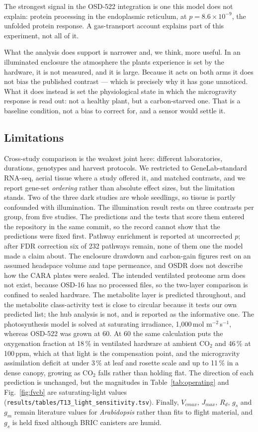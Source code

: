 \documentclass[pdflatex,sn-nature]{sn-jnl}
\begin{document}
The strongest signal in the OSD-522 integration is one this model does not explain: protein
processing in the endoplasmic reticulum, at $p = 8.6\times10^{-9}$, the unfolded protein
response. A gas-transport account explains part of this experiment, not all of it.

What the analysis does support is narrower and, we think, more useful. In an illuminated
enclosure the atmosphere the plants experience is set by the hardware, it is not measured, and
it is large. Because it acts on both arms it does not bias the published contrast --- which is
precisely why it has gone unnoticed. What it does instead is set the physiological state in
which the microgravity response is read out: not a healthy plant, but a carbon-starved one.
That is a baseline condition, not a bias to correct for, and a sensor would settle it.

\subsection{Limitations}

Cross-study comparison is the weakest joint here: different laboratories, durations,
genotypes and harvest protocols. We restricted to GeneLab-standard RNA-seq, aerial tissue
where a study offered it, and matched contrasts, and we report gene-set \emph{ordering} rather
than absolute effect sizes, but the limitation stands. Two of the three dark studies are whole
seedlings, so tissue is partly confounded with illumination. The illumination result rests on
three contrasts per group, from five studies. The predictions and the tests that score them
entered the repository in the same commit, so the record cannot show that the predictions
were fixed first. Pathway enrichment is reported at uncorrected $p$; after FDR correction six
of 232 pathways remain, none of them one the model made a claim about. The enclosure drawdown
and carbon-gain figures rest on an assumed headspace volume and tape permeance, and OSDR does
not describe how the CARA plates were sealed. The intended ventilated proteome arm does not exist, because OSD-16 has no processed
files, so the two-layer comparison is confined to sealed hardware. The metabolite layer is
predicted throughout, and the metabolite class-activity test is close to circular because it
tests our own predicted list; the hub analysis is not, and is reported as the informative one.
The photosynthesis model is solved at saturating irradiance, 1{,}000\,\textmu mol
m$^{-2}$\,s$^{-1}$, whereas OSD-522 was grown at 60. At 60 the same calculation puts the
oxygenation fraction at 18\,\% in ventilated hardware at ambient CO$_2$ and 46\,\% at
100\,ppm, which at that light is the compensation point, and the microgravity assimilation
deficit at under 3\,\% at leaf and rosette scale and up to 11\,\% in a dense canopy,
growing as CO$_2$ falls rather than holding flat. The direction of each prediction is unchanged, but the magnitudes in
Table~\ref{tab:operating} and Fig.~\ref{fig:fvcb} are saturating-light values
(\texttt{results/tables/T13\_light\_sensitivity.tsv}).
Finally, $V_{cmax}$, $J_{max}$, $R_d$, $g_s$ and $g_m$ remain literature values for
\textit{Arabidopsis} rather than fits to flight material, and $g_s$ is held fixed although
BRIC canisters are humid.
\end{document}
